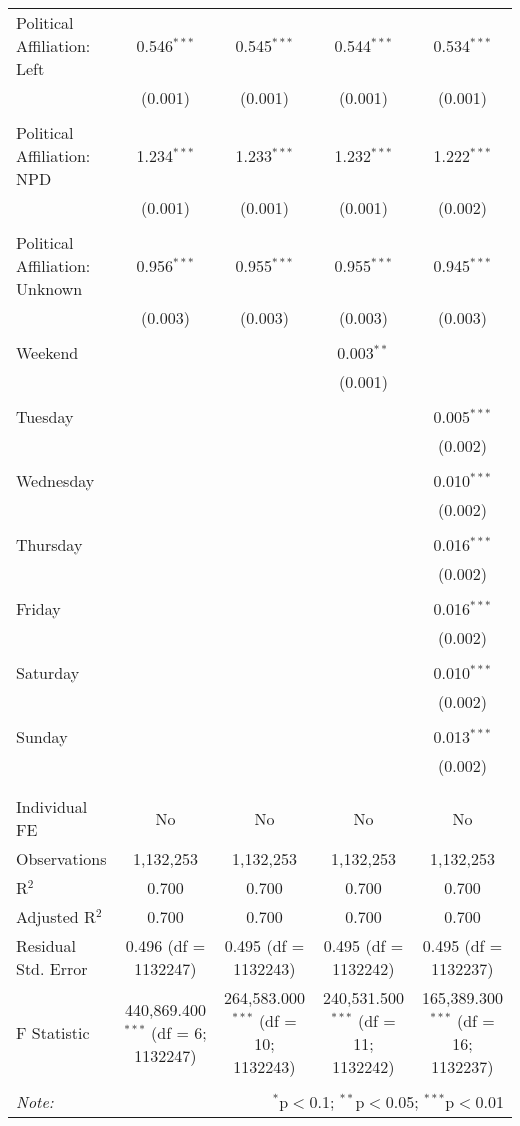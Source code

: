 \documentclass[
]{article}
\begin{document}
\begin{table}[!htbp]
{\begin{tabular}{@{\extracolsep{5pt}}lcccc}
 Political Affiliation: Left & 0.546$^{***}$ & 0.545$^{***}$ & 0.544$^{***}$ & 0.534$^{***}$ \\ 
  & (0.001) & (0.001) & (0.001) & (0.001) \\ 
  & & & & \\ 
 Political Affiliation: NPD & 1.234$^{***}$ & 1.233$^{***}$ & 1.232$^{***}$ & 1.222$^{***}$ \\ 
  & (0.001) & (0.001) & (0.001) & (0.002) \\ 
  & & & & \\ 
 Political Affiliation: Unknown & 0.956$^{***}$ & 0.955$^{***}$ & 0.955$^{***}$ & 0.945$^{***}$ \\ 
  & (0.003) & (0.003) & (0.003) & (0.003) \\ 
  & & & & \\ 
 Weekend &  &  & 0.003$^{**}$ &  \\ 
  &  &  & (0.001) &  \\ 
  & & & & \\ 
 Tuesday &  &  &  & 0.005$^{***}$ \\ 
  &  &  &  & (0.002) \\ 
  & & & & \\ 
 Wednesday &  &  &  & 0.010$^{***}$ \\ 
  &  &  &  & (0.002) \\ 
  & & & & \\ 
 Thursday &  &  &  & 0.016$^{***}$ \\ 
  &  &  &  & (0.002) \\ 
  & & & & \\ 
 Friday &  &  &  & 0.016$^{***}$ \\ 
  &  &  &  & (0.002) \\ 
  & & & & \\ 
 Saturday &  &  &  & 0.010$^{***}$ \\ 
  &  &  &  & (0.002) \\ 
  & & & & \\ 
 Sunday &  &  &  & 0.013$^{***}$ \\ 
  &  &  &  & (0.002) \\ 
  & & & & \\ 
\hline \\[-1.8ex] 
Individual FE & No & No & No & No \\ 
Observations & 1,132,253 & 1,132,253 & 1,132,253 & 1,132,253 \\ 
R$^{2}$ & 0.700 & 0.700 & 0.700 & 0.700 \\ 
Adjusted R$^{2}$ & 0.700 & 0.700 & 0.700 & 0.700 \\ 
Residual Std. Error & 0.496 (df = 1132247) & 0.495 (df = 1132243) & 0.495 (df = 1132242) & 0.495 (df = 1132237) \\ 
F Statistic & 440,869.400$^{***}$ (df = 6; 1132247) & 264,583.000$^{***}$ (df = 10; 1132243) & 240,531.500$^{***}$ (df = 11; 1132242) & 165,389.300$^{***}$ (df = 16; 1132237) \\ 
\hline 
\hline \\[-1.8ex] 
\textit{Note:}  & \multicolumn{4}{r}{$^{*}$p$<$0.1; $^{**}$p$<$0.05; $^{***}$p$<$0.01} \\ 
\end{tabular}
} 
\end{table} 
\newpage
\end{document}
